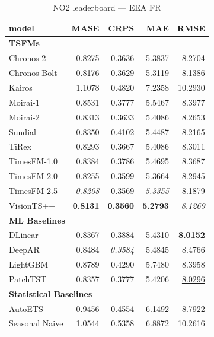 \begin{table}[H]
\caption{NO2 leaderboard --- EEA FR}
\centering
\begin{small}
\begin{tabular}{lrrrr}
\toprule
model & MASE & CRPS & MAE & RMSE \\
\midrule
\multicolumn{5}{l}{\textbf{TSFMs}} \\
Chronos-2 & 0.8275 & 0.3636 & 5.3837 & 8.2704 \\
Chronos-Bolt & \underline{0.8176} & 0.3629 & \underline{5.3119} & 8.1386 \\
Kairos & 1.1078 & 0.4820 & 7.2358 & 10.2930 \\
Moirai-1 & 0.8531 & 0.3777 & 5.5467 & 8.3977 \\
Moirai-2 & 0.8313 & 0.3633 & 5.4086 & 8.2653 \\
Sundial & 0.8350 & 0.4102 & 5.4487 & 8.2165 \\
TiRex & 0.8293 & 0.3667 & 5.4086 & 8.3011 \\
TimesFM-1.0 & 0.8384 & 0.3786 & 5.4695 & 8.3687 \\
TimesFM-2.0 & 0.8255 & 0.3599 & 5.3664 & 8.2945 \\
TimesFM-2.5 & \textit{0.8208} & \underline{0.3569} & \textit{5.3355} & 8.1879 \\
VisionTS++ & \textbf{0.8131} & \textbf{0.3560} & \textbf{5.2793} & \textit{8.1269} \\
\midrule
\multicolumn{5}{l}{\textbf{ML Baselines}} \\
DLinear & 0.8367 & 0.3884 & 5.4310 & \textbf{8.0152} \\
DeepAR & 0.8484 & \textit{0.3584} & 5.4845 & 8.4766 \\
LightGBM & 0.8789 & 0.4290 & 5.7480 & 8.3958 \\
PatchTST & 0.8357 & 0.3777 & 5.4206 & \underline{8.0296} \\
\midrule
\multicolumn{5}{l}{\textbf{Statistical Baselines}} \\
AutoETS & 0.9456 & 0.4554 & 6.1492 & 8.7922 \\
Seasonal Naive & 1.0544 & 0.5358 & 6.8872 & 10.2616 \\
\bottomrule
\end{tabular}
\end{small}
\end{table}